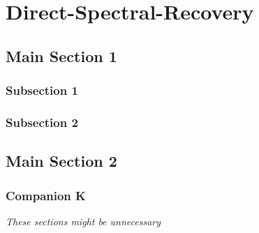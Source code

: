 

\chapter{Direct-Spectral-Recovery}  %

\label{cha:Chapter3} 


\section{Main Section 1}



\subsection{Subsection 1}



\subsection{Subsection 2}


\section{Main Section 2}



\subsection{Companion K}
\label{sec:companion_RV}
\emph{These sections might be unnecessary}\\


